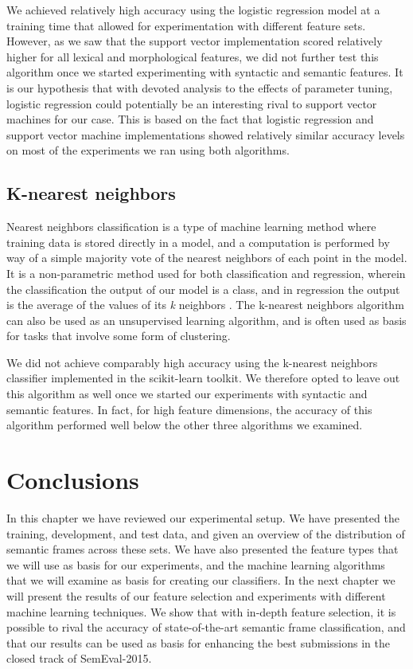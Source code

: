 We achieved relatively high accuracy using the logistic regression model at a training time that allowed for experimentation with different feature sets. However, as we saw that the support vector implementation scored relatively higher for all lexical and morphological features, we did not further test this algorithm once we started experimenting with syntactic and semantic features. It is our hypothesis that with devoted analysis to the effects of parameter tuning, logistic regression could potentially be an interesting rival to support vector machines for our case. This is based on the fact that logistic regression and support vector machine implementations showed relatively similar accuracy levels on most of the experiments we ran using both algorithms.

\subsection{K-nearest neighbors}

Nearest neighbors classification is a type of machine learning method where training data is stored directly in a model, and a computation is performed by way of a simple majority vote of the nearest neighbors of each point in the model. It is a non-parametric method used for both classification and regression, wherein the classification the output of our model is a class, and in regression the output is the average of the values of its \textit{k} neighbors \cite{Altman:92}. The k-nearest neighbors algorithm can also be used as an unsupervised learning algorithm, and is often used as basis for tasks that involve some form of clustering.

We did not achieve comparably high accuracy using the k-nearest neighbors classifier implemented in the scikit-learn toolkit. We therefore opted to leave out this algorithm as well once we started our experiments with syntactic and semantic features. In fact, for high feature dimensions, the accuracy of this algorithm performed well below the other three algorithms we examined.

\section{Conclusions}

In this chapter we have reviewed our experimental setup. We have presented the training, development, and test data, and given an overview of the distribution of semantic frames across these sets. We have also presented the feature types that we will use as basis for our experiments, and the machine learning algorithms that we will examine as basis for creating our classifiers. In the next chapter we will present the results of our feature selection and experiments with different machine learning techniques. We show that with in-depth feature selection, it is possible to rival the accuracy of state-of-the-art semantic frame classification, and that our results can be used as basis for enhancing the best submissions in the closed track of SemEval-2015.